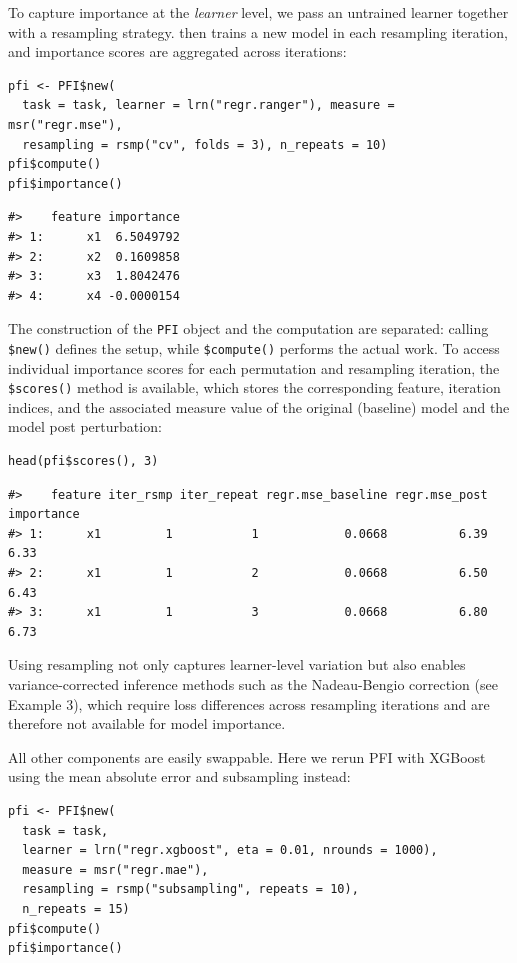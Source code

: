 To capture importance at the \emph{learner} level, we pass an untrained learner together with a resampling strategy.
 then trains a new model in each resampling iteration, and importance scores are aggregated across iterations:

\begin{verbatim}
pfi <- PFI$new(
  task = task, learner = lrn("regr.ranger"), measure = msr("regr.mse"),
  resampling = rsmp("cv", folds = 3), n_repeats = 10)
pfi$compute()
pfi$importance()
\end{verbatim}

\begin{verbatim}
#>    feature importance
#> 1:      x1  6.5049792
#> 2:      x2  0.1609858
#> 3:      x3  1.8042476
#> 4:      x4 -0.0000154
\end{verbatim}

The construction of the \texttt{PFI} object and the computation are separated: calling \texttt{\$new()} defines the setup, while \texttt{\$compute()} performs the actual work.
To access individual importance scores for each permutation and resampling iteration, the \texttt{\$scores()} method is available, which stores the corresponding feature, iteration indices, and the associated measure value of the original (baseline) model and the model post perturbation:

\begin{verbatim}
head(pfi$scores(), 3)
\end{verbatim}

\begin{verbatim}
#>    feature iter_rsmp iter_repeat regr.mse_baseline regr.mse_post importance
#> 1:      x1         1           1            0.0668          6.39       6.33
#> 2:      x1         1           2            0.0668          6.50       6.43
#> 3:      x1         1           3            0.0668          6.80       6.73
\end{verbatim}

Using resampling not only captures learner-level variation but also enables variance-corrected inference methods such as the Nadeau-Bengio correction (see Example 3), which require loss differences across resampling iterations and are therefore not available for model importance.

All other components are easily swappable.
Here we rerun PFI with XGBoost using the mean absolute error and subsampling instead:

\begin{verbatim}
pfi <- PFI$new(
  task = task,
  learner = lrn("regr.xgboost", eta = 0.01, nrounds = 1000),
  measure = msr("regr.mae"),
  resampling = rsmp("subsampling", repeats = 10),
  n_repeats = 15)
pfi$compute()
pfi$importance()
\end{verbatim}

